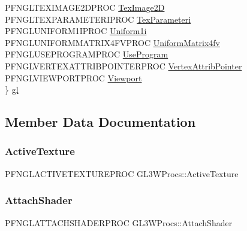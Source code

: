 \begin{DoxyCompactItemize}
\begin{tabbing}
\>PFNGLTEXIMAGE2DPROC \hyperlink{unionGL3WProcs_a4dea3792bcd39447e0292a1b792ce3f6}{TexImage2D}\\
\>PFNGLTEXPARAMETERIPROC \hyperlink{unionGL3WProcs_acfa1a15cd9ef9725e3ede4d51303129a}{TexParameteri}\\
\>PFNGLUNIFORM1IPROC \hyperlink{unionGL3WProcs_af81776f0c70be61b60238c271082a793}{Uniform1i}\\
\>PFNGLUNIFORMMATRIX4FVPROC \hyperlink{unionGL3WProcs_a6caeb4032f438537c3849c3bbd546817}{UniformMatrix4fv}\\
\>PFNGLUSEPROGRAMPROC \hyperlink{unionGL3WProcs_abc5123d25a1c7680a5c492c2b744e450}{UseProgram}\\
\>PFNGLVERTEXATTRIBPOINTERPROC \hyperlink{unionGL3WProcs_a46534eed48091b8e77429901430eb4fc}{VertexAttribPointer}\\
\>PFNGLVIEWPORTPROC \hyperlink{unionGL3WProcs_ad40451fef55ebd6722450b1024fa4a5c}{Viewport}\\
\} \hyperlink{unionGL3WProcs_a4d900d58aa2cea3989e994b822deb0b8}{gl}\\

\end{tabbing}\end{DoxyCompactItemize}


\subsection{Member Data Documentation}
\mbox{\label{unionGL3WProcs_a1fa26081b7b2b7f69470fb759374ee42}} 
\subsubsection{\texorpdfstring{Active\+Texture}{ActiveTexture}}
{\footnotesize\ttfamily P\+F\+N\+G\+L\+A\+C\+T\+I\+V\+E\+T\+E\+X\+T\+U\+R\+E\+P\+R\+OC G\+L3\+W\+Procs\+::\+Active\+Texture}

\mbox{\label{unionGL3WProcs_a6cb4161d70caada26c0ecc3cc427aab7}} 
\subsubsection{\texorpdfstring{Attach\+Shader}{AttachShader}}
{\footnotesize\ttfamily P\+F\+N\+G\+L\+A\+T\+T\+A\+C\+H\+S\+H\+A\+D\+E\+R\+P\+R\+OC G\+L3\+W\+Procs\+::\+Attach\+Shader}

